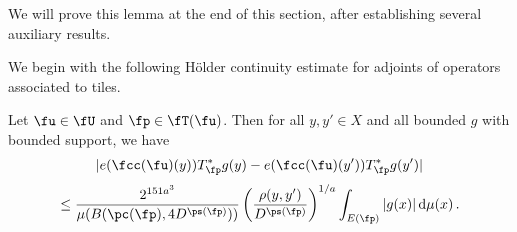     We will prove this lemma at the end of this section, after establishing several auxiliary results.

    We begin with the following H\"older continuity estimate for adjoints of operators associated to tiles.
    \begin{lemma}
        \label{Holder-correlation-tile}
        \leanok
        Let $\fu \in \fU$ and $\fp \in \fT(\fu)$. Then for all $y, y' \in X$ and all bounded $g$ with bounded support, we have
        $$
            |e(\fcc(\fu)(y)) T_{\fp}^* g(y) - e(\fcc(\fu)(y')) T_{\fp}^* g(y')|
        $$
      \begin{equation}
            \label{T*Holder2}
            \le \frac{2^{151a^3}}{\mu(B(\pc(\fp), 4D^{\ps(\fp)}))} \left(\frac{\rho(y, y')}{D^{\ps(\fp)}}\right)^{1/a} \int_{E(\fp)} |g(x)| \, \mathrm{d}\mu(x)\,.
        \end{equation}
    \end{lemma}

